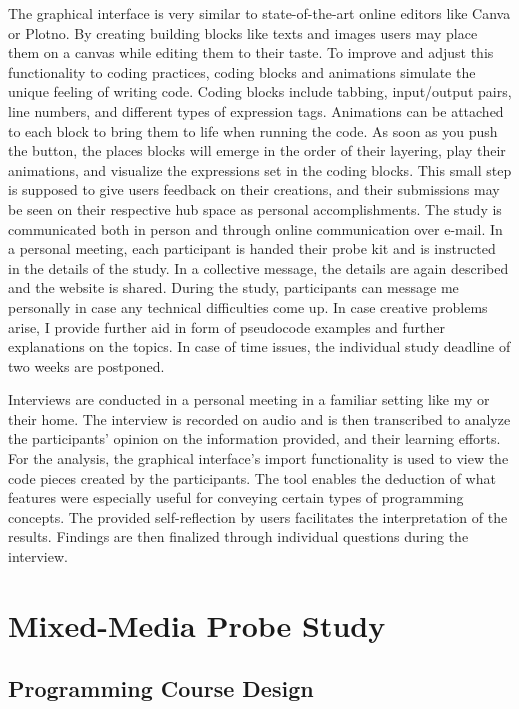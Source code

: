 The graphical interface is very similar to state-of-the-art online editors like Canva or Plotno. By creating building blocks like texts and images users may place them on a canvas while editing them to their taste. To improve and adjust this functionality to coding practices, coding blocks and animations simulate the unique feeling of writing code. Coding blocks include tabbing, input/output pairs, line numbers, and different types of expression tags. Animations can be attached to each block to bring them to life when running the code. As soon as you push the button, the places blocks will emerge in the order of their layering, play their animations, and visualize the expressions set in the coding blocks. This small step is supposed to give users feedback on their creations, and their submissions may be seen on their respective hub space as personal accomplishments. 
The study is communicated both in person and through online communication over e-mail. In a personal meeting, each participant is handed their probe kit and is instructed in the details of the study. In a collective message, the details are again described and the website is shared. During the study, participants can message me personally in case any technical difficulties come up. In case creative problems arise, I provide further aid in form of pseudocode examples and further explanations on the topics. In case of time issues, the individual study deadline of two weeks are postponed. 

Interviews are conducted in a personal meeting in a familiar setting like my or their home. The interview is recorded on audio and is then transcribed to analyze the participants’ opinion on the information provided, and their learning efforts.
For the analysis, the graphical interface’s import functionality is used to view the code pieces created by the participants. The tool enables the deduction of what features were especially useful for conveying certain types of programming concepts. The provided self-reflection by users facilitates the interpretation of the results. Findings are then finalized through individual questions during the interview.

\section{Mixed-Media Probe Study}
\subsection{Programming Course Design}
